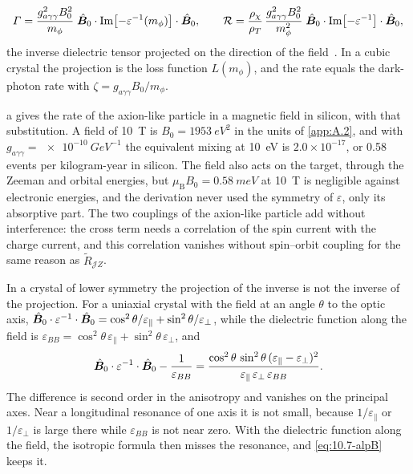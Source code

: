 \begin{keyresult}
\begin{equation}
  \varGamma = \frac{g_{a\gamma\gamma}^2B_0^2}{m_\phi}\;\hat{\bm{B}}_0\cdot\operatorname{Im}\bigl[-\varepsilon^{-1}(m_\phi)\bigr]\cdot\hat{\bm{B}}_0 , \qquad
  \mathcal{R} = \frac{\rho_\chi}{\rho_T}\,\frac{g_{a\gamma\gamma}^2B_0^2}{m_\phi^2}\;\hat{\bm{B}}_0\cdot\operatorname{Im}\bigl[-\varepsilon^{-1}\bigr]\cdot\hat{\bm{B}}_0 ,
  \label{eq:10.7-alpB}
\end{equation}
the inverse dielectric tensor projected on the direction of the field~\cite[Eqs.~(6) and (7)]{berlin2024absorption}. In a cubic crystal the projection is the loss function $L(m_\phi)$, and the rate equals the dark-photon rate with $\zeta = g_{a\gamma\gamma}B_0/m_\phi$.
\end{keyresult}
\noindent {}a gives the rate of the axion-like particle in a magnetic field in silicon, with that substitution. A field of \SI{10}{T} is $B_0 = \SI{1953}{eV^2}$ in the units of \cref{app:A.2}, and with $g_{a\gamma\gamma} = \SI{e-10}{GeV^{-1}}$ the equivalent mixing at \SI{10}{eV} is $2.0\times10^{-17}$, or 0.58 events per kilogram-year in silicon. The field also acts on the target, through the Zeeman and orbital energies, but $\mu_{\mathrm{B}}B_0 = \SI{0.58}{meV}$ at \SI{10}{T} is negligible against electronic energies, and the derivation never used the symmetry of $\varepsilon$, only its absorptive part. The two couplings of the axion-like particle add without interference: the cross term needs a correlation of the spin current with the charge current, and this correlation vanishes without spin--orbit coupling for the same reason as $\tilde R_{\mathcal{J}Z}$.

In a crystal of lower symmetry the projection of the inverse is not the inverse of the projection. For a uniaxial crystal with the field at an angle $\theta$ to the optic axis, $\hat{\bm{B}}_0\cdot\varepsilon^{-1}\cdot\hat{\bm{B}}_0 = \cos^2\theta/\varepsilon_\parallel + \sin^2\theta/\varepsilon_\perp$, while the dielectric function along the field is $\varepsilon_{BB} = \cos^2\theta\,\varepsilon_\parallel + \sin^2\theta\,\varepsilon_\perp$, and
\begin{equation}
  \hat{\bm{B}}_0\cdot\varepsilon^{-1}\cdot\hat{\bm{B}}_0 - \frac{1}{\varepsilon_{BB}} = \frac{\cos^2\theta\,\sin^2\theta\,(\varepsilon_\parallel - \varepsilon_\perp)^2}{\varepsilon_\parallel\,\varepsilon_\perp\,\varepsilon_{BB}} .
  \label{eq:10.7-aniso}
\end{equation}
The difference is second order in the anisotropy and vanishes on the principal axes. Near a longitudinal resonance of one axis it is not small, because $1/\varepsilon_\parallel$ or $1/\varepsilon_\perp$ is large there while $\varepsilon_{BB}$ is not near zero. With the dielectric function along the field, the isotropic formula then misses the resonance, and \cref{eq:10.7-alpB} keeps it.

